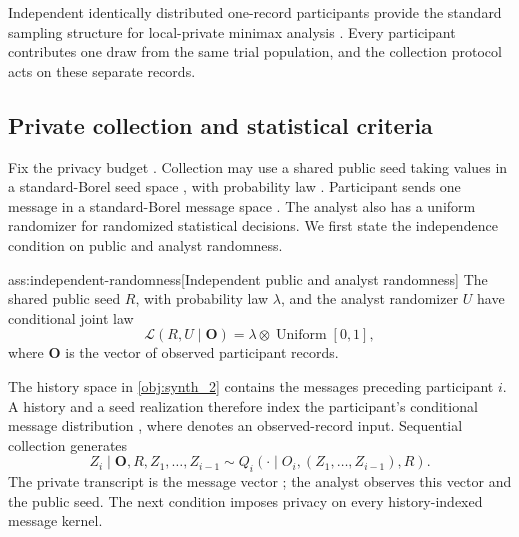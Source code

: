 \documentclass[11pt]{article}
\begin{document}
Independent identically distributed one-record participants provide the standard sampling structure for local-private minimax analysis \citep{DuchiJordanWainwright2018Minimax}. Every participant contributes one draw from the same trial population, and the collection protocol acts on these separate records.

\subsection{Private collection and statistical criteria}

Fix the privacy budget . Collection may use a shared public seed  taking values in a standard-Borel seed space , with probability law . Participant  sends one message in a standard-Borel message space . The analyst also has a uniform randomizer  for randomized statistical decisions. We first state the independence condition on public and analyst randomness.

\begin{assumptionv}{ass:independent-randomness}[Independent public and analyst randomness]
The shared public seed \(R\), with probability law \(\lambda\), and the analyst randomizer \(U\) have conditional joint law
\[
\mathcal L(R,U\mid\mathbf O)
=\lambda\otimes\operatorname{Uniform}[0,1],
\]
where \(\mathbf O\) is the vector of observed participant records.
\end{assumptionv}

The history space  in \cref{obj:synth_2} contains the messages preceding participant \(i\). A history  and a seed realization  therefore index the participant's conditional message distribution , where  denotes an observed-record input. Sequential collection generates
\[
Z_i\mid \mathbf O,R,Z_1,\ldots,Z_{i-1}
\sim Q_i(\cdot\mid O_i,(Z_1,\ldots,Z_{i-1}),R).
\]
The private transcript is the message vector ; the analyst observes this vector and the public seed. The next condition imposes privacy on every history-indexed message kernel.
\end{document}
